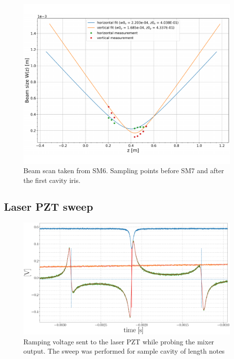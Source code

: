 \begin{figure}[H]
\includegraphics[width=\textwidth]{figs/ALGAAS/beam_scans/01_12_2021_postMMT.pdf}
\caption{Beam scan taken from SM6. Sampling points before SM7 and after the first cavity iris.}
\label{fig:beam_scan_2021}
\end{figure}

\subsection{Laser PZT sweep}

\begin{figure}[H]
	\includegraphics[width=\textwidth]{figs/ALGAAS/pdh_measured.pdf}
	\caption{Ramping voltage sent to the laser PZT while probing the mixer output. The sweep was performed for sample cavity of length notes}
\label{fig:pdh_measured}
\end{figure}


